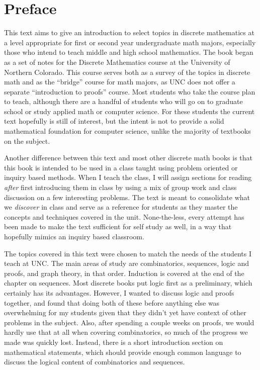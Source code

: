 \documentclass[10pt,]{book}
\theoremstyle{plain}
\theoremstyle{definition}
\theoremstyle{definition}
\theoremstyle{definition}
\theoremstyle{definition}
\numberwithin{equation}{chapter}
\begin{document}
\chapter*{Preface}\label{preface}
\hypertarget{p-7}{}%
This text aims to give an introduction to select topics in discrete mathematics at a level appropriate for first or second year undergraduate math majors, especially those who intend to teach middle and high school mathematics. The book began as a set of notes for the Discrete Mathematics course at the University of Northern Colorado. This course serves both as a survey of the topics in discrete math and as the ``bridge'' course for math majors, as UNC does not offer a separate ``introduction to proofs'' course. Most students who take the course plan to teach, although there are a handful of students who will go on to graduate school or study applied math or computer science. For these students the current text hopefully is still of interest, but the intent is not to provide a solid mathematical foundation for computer science, unlike the majority of textbooks on the subject.%
\par
\hypertarget{p-8}{}%
Another difference between this text and most other discrete math books is that this book is intended to be used in a class taught using problem oriented or inquiry based methods. When I teach the class, I will assign sections for reading \emph{after} first introducing them in class by using a mix of group work and class discussion on a few interesting problems. The text is meant to consolidate what we \emph{discover} in class and serve as a reference for students as they master the concepts and techniques covered in the unit. None-the-less, every attempt has been made to make the text sufficient for self study as well, in a way that hopefully mimics an inquiry based classroom.%
\par
\hypertarget{p-9}{}%
The topics covered in this text were chosen to match the needs of the students I teach at UNC. The main areas of study are combinatorics, sequences, logic and proofs, and graph theory, in that order. Induction is covered at the end of the chapter on sequences. Most discrete books put logic first as a preliminary, which certainly has its advantages. However, I wanted to discuss logic and proofs together, and found that doing both of these before anything else was overwhelming for my students given that they didn't yet have context of other problems in the subject. Also, after spending a couple weeks on proofs, we would hardly use that at all when covering combinatorics, so much of the progress we made was quickly lost.  Instead, there is a short introduction section on mathematical statements, which should provide enough common language to discuss the logical content of combinatorics and sequences.%
\end{document}
